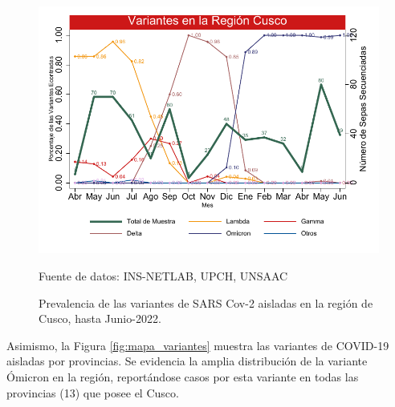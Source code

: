 \documentclass[12pt,a4paper,openany]{book}
\begin{document}
	\begin{figure}[h]
		\caption{Prevalencia de las variantes de SARS Cov-2 aisladas en la región de Cusco, hasta Junio-2022. }\label{fig:variantes}
		\begin{center}
			\includegraphics[width=0.85\linewidth]{../figuras/variantes.pdf}
		\end{center}
		{\footnotesize {Fuente de datos: INS-NETLAB, UPCH, UNSAAC}}
	\end{figure}
	
	Asimismo, la Figura \ref{fig:mapa_variantes} muestra las variantes de COVID-19 aisladas por provincias. Se evidencia la amplia distribución de la variante Ómicron en la región, reportándose casos por esta variante en todas las provincias (13) que posee el Cusco.
	
\end{document}
